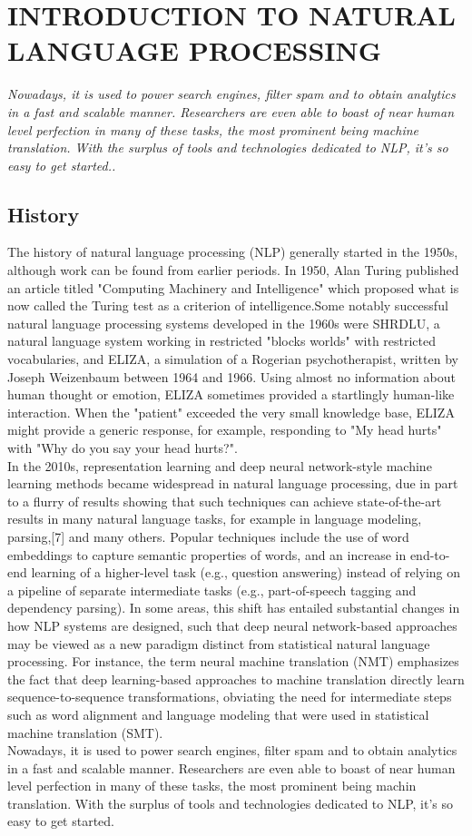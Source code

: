 \chapter{INTRODUCTION TO NATURAL LANGUAGE PROCESSING}
{\em Nowadays, it is used to power search engines, filter spam and to obtain analytics in a fast and scalable manner. Researchers are even able to boast of near human level perfection in many of these tasks, the most prominent being machine translation. With the surplus of tools and technologies dedicated to NLP, it’s so easy to get started.. }

\section{History}
The history of natural language processing (NLP) generally started in the 1950s, although work can be found from earlier periods. In 1950, Alan Turing published an article titled "Computing Machinery and Intelligence" which proposed what is now called the Turing test as a criterion of intelligence.Some notably successful natural language processing systems developed in the 1960s were SHRDLU, a natural language system working in restricted "blocks worlds" with restricted vocabularies, and ELIZA, a simulation of a Rogerian psychotherapist, written by Joseph Weizenbaum between 1964 and 1966. Using almost no information about human thought or emotion, ELIZA sometimes provided a startlingly human-like interaction. When the "patient" exceeded the very small knowledge base, ELIZA might provide a generic response, for example, responding to "My head hurts" with "Why do you say your head hurts?".\\
In the 2010s, representation learning and deep neural network-style machine learning methods became widespread in natural language processing, due in part to a flurry of results showing that such techniques can achieve state-of-the-art results in many natural language tasks, for example in language modeling, parsing,[7] and many others. Popular techniques include the use of word embeddings to capture semantic properties of words, and an increase in end-to-end learning of a higher-level task (e.g., question answering) instead of relying on a pipeline of separate intermediate tasks (e.g., part-of-speech tagging and dependency parsing). In some areas, this shift has entailed substantial changes in how NLP systems are designed, such that deep neural network-based approaches may be viewed as a new paradigm distinct from statistical natural language processing. For instance, the term neural machine translation (NMT) emphasizes the fact that deep learning-based approaches to machine translation directly learn sequence-to-sequence transformations, obviating the need for intermediate steps such as word alignment and language modeling that were used in statistical machine translation (SMT).\\Nowadays, it is used to power search engines, filter spam and to obtain analytics in a fast and scalable manner. Researchers are even able to boast of near human level perfection in many of these tasks, the most prominent being machin translation. With the surplus of tools and technologies dedicated to NLP, it’s so easy to get started.
